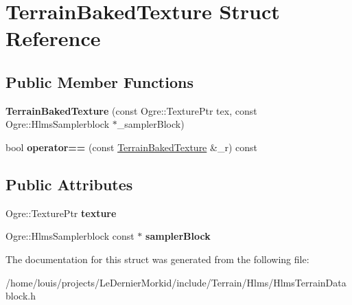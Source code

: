 \hypertarget{struct_terrain_baked_texture}{}\section{Terrain\+Baked\+Texture Struct Reference}
\label{struct_terrain_baked_texture}
\subsection*{Public Member Functions}
\begin{DoxyCompactItemize}
\item 
\mbox{\label{struct_terrain_baked_texture_a662c33c58c79a184be57c48cff7ebdff}} 
{\bfseries Terrain\+Baked\+Texture} (const Ogre\+::\+Texture\+Ptr tex, const Ogre\+::\+Hlms\+Samplerblock $\ast$\+\_\+sampler\+Block)
\item 
\mbox{\label{struct_terrain_baked_texture_a7654b92aa3209e29c6b04b89d7134945}} 
bool {\bfseries operator==} (const \hyperlink{struct_terrain_baked_texture}{Terrain\+Baked\+Texture} \&\+\_\+r) const
\end{DoxyCompactItemize}
\subsection*{Public Attributes}
\begin{DoxyCompactItemize}
\item 
\mbox{\label{struct_terrain_baked_texture_aee3e546c44ff51c6954a3433b453747c}} 
Ogre\+::\+Texture\+Ptr {\bfseries texture}
\item 
\mbox{\label{struct_terrain_baked_texture_af238f5927b36e48a6066fe597acf90a8}} 
Ogre\+::\+Hlms\+Samplerblock const  $\ast$ {\bfseries sampler\+Block}
\end{DoxyCompactItemize}


The documentation for this struct was generated from the following file\+:\begin{DoxyCompactItemize}
\item 
/home/louis/projects/\+Le\+Dernier\+Morkid/include/\+Terrain/\+Hlms/Hlms\+Terrain\+Datablock.\+h\end{DoxyCompactItemize}
